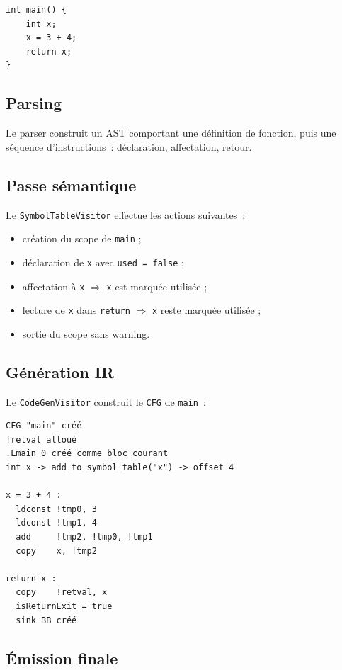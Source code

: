 \documentclass[11pt,a4paper]{article}
\begin{document}
\begin{lstlisting}
int main() {
    int x;
    x = 3 + 4;
    return x;
}
\end{lstlisting}

\subsection{Parsing}

Le parser construit un AST comportant une définition de fonction, puis une séquence d'instructions~: déclaration, affectation, retour.

\subsection{Passe sémantique}

Le \texttt{SymbolTableVisitor} effectue les actions suivantes~:

\begin{itemize}
  \item création du scope de \texttt{main} ;
  \item déclaration de \texttt{x} avec \texttt{used = false} ;
  \item affectation à \texttt{x} $\Rightarrow$ \texttt{x} est marquée utilisée ;
  \item lecture de \texttt{x} dans \texttt{return} $\Rightarrow$ \texttt{x} reste marquée utilisée ;
  \item sortie du scope sans warning.
\end{itemize}

\subsection{Génération IR}

Le \texttt{CodeGenVisitor} construit le \texttt{CFG} de \texttt{main}~:

\begin{lstlisting}
CFG "main" créé
!retval alloué
.Lmain_0 créé comme bloc courant
int x -> add_to_symbol_table("x") -> offset 4

x = 3 + 4 :
  ldconst !tmp0, 3
  ldconst !tmp1, 4
  add     !tmp2, !tmp0, !tmp1
  copy    x, !tmp2

return x :
  copy    !retval, x
  isReturnExit = true
  sink BB créé
\end{lstlisting}

\subsection{Émission finale}
\end{document}
